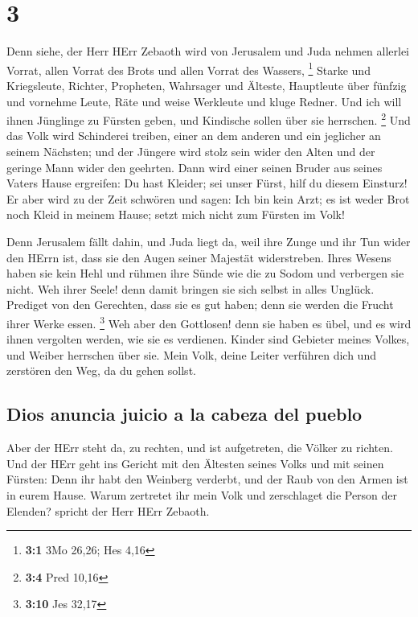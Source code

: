 \hypertarget{section-2}{%
\section{3}\label{section-2}}

 Denn siehe, der Herr HErr Zebaoth wird von Jerusalem und
Juda nehmen allerlei Vorrat, allen Vorrat des Brots und allen Vorrat des
Wassers, \footnote{\textbf{3:1} 3Mo 26,26; Hes 4,16} 
Starke und Kriegsleute, Richter, Propheten, Wahrsager und Älteste,
 Hauptleute über fünfzig und vornehme Leute, Räte und
weise Werkleute und kluge Redner.  Und ich will ihnen
Jünglinge zu Fürsten geben, und Kindische sollen über sie herrschen.
\footnote{\textbf{3:4} Pred 10,16}  Und das Volk wird
Schinderei treiben, einer an dem anderen und ein jeglicher an seinem
Nächsten; und der Jüngere wird stolz sein wider den Alten und der
geringe Mann wider den geehrten.  Dann wird einer seinen
Bruder aus seines Vaters Hause ergreifen: Du hast Kleider; sei unser
Fürst, hilf du diesem Einsturz!  Er aber wird zu der Zeit
schwören und sagen: Ich bin kein Arzt; es ist weder Brot noch Kleid in
meinem Hause; setzt mich nicht zum Fürsten im Volk!

 Denn Jerusalem fällt dahin, und Juda liegt da, weil ihre
Zunge und ihr Tun wider den HErrn ist, dass sie den Augen seiner
Majestät widerstreben.  Ihres Wesens haben sie kein Hehl
und rühmen ihre Sünde wie die zu Sodom und verbergen sie nicht. Weh
ihrer Seele! denn damit bringen sie sich selbst in alles Unglück.
 Prediget von den Gerechten, dass sie es gut haben; denn
sie werden die Frucht ihrer Werke essen. \footnote{\textbf{3:10} Jes
  32,17}  Weh aber den Gottlosen! denn sie haben es übel,
und es wird ihnen vergolten werden, wie sie es verdienen.
 Kinder sind Gebieter meines Volkes, und Weiber herrschen
über sie. Mein Volk, deine Leiter verführen dich und zerstören den Weg,
da du gehen sollst.

\hypertarget{dios-anuncia-juicio-a-la-cabeza-del-pueblo}{%
\subsection{Dios anuncia juicio a la cabeza del
pueblo}\label{dios-anuncia-juicio-a-la-cabeza-del-pueblo}}

 Aber der HErr steht da, zu rechten, und ist aufgetreten,
die Völker zu richten.  Und der HErr geht ins Gericht mit
den Ältesten seines Volks und mit seinen Fürsten: Denn ihr habt den
Weinberg verderbt, und der Raub von den Armen ist in eurem Hause.
 Warum zertretet ihr mein Volk und zerschlaget die Person
der Elenden? spricht der Herr HErr Zebaoth.

